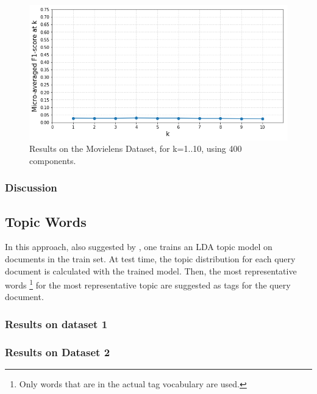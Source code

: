 \begin{figure}[!h]
    \centering
    \includegraphics[width=\textwidth]{chapters/05_experiments/images/topic-distances-400d-movielens.png}
    \caption{Results on the Movielens Dataset, for k=1..10, using 400 components.}
    \label{fig:ovr_svm_movielens}
\end{figure}

\subsubsection{Discussion}

\subsection{Topic Words}

In this approach, also suggested by \cite{choubey_2011}, one trains an LDA topic model on documents in the train set. At test time, the topic distribution for each query document is calculated with the trained model. Then, the most representative words \footnote{Only words that are in the actual tag vocabulary are used.} for the most representative topic are suggested as tags for the query document.

\subsubsection{Results on dataset 1}

\subsubsection{Results on Dataset 2}

